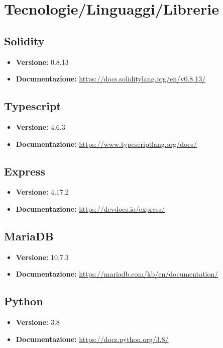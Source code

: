 \documentclass[a4paper, 12pt]{article}
\begin{document}
\section{Tecnologie/Linguaggi/Librerie}

\subsection{Solidity}
\begin{itemize}
\item \textbf{Versione:} 0.8.13
\item \textbf{Documentazione:} \href{https://docs.soliditylang.org/en/v0.8.13/}{https://docs.soliditylang.org/en/v0.8.13/}
\end{itemize}

\subsection{Typescript}
\begin{itemize}
\item \textbf{Versione:} 4.6.3
\item \textbf{Documentazione:} \href{https://www.typescriptlang.org/docs/}{https://www.typescriptlang.org/docs/}
\end{itemize}

\subsection{Express}
\begin{itemize}
\item \textbf{Versione:} 4.17.2
\item \textbf{Documentazione:} \href{https://devdocs.io/express/}{https://devdocs.io/express/}
\end{itemize}

\subsection{MariaDB}
\begin{itemize}
\item \textbf{Versione:} 10.7.3
\item \textbf{Documentazione:} \href{https://mariadb.com/kb/en/documentation/}{https://mariadb.com/kb/en/documentation/}
\end{itemize}

\subsection{Python}
\begin{itemize}
\item \textbf{Versione:} 3.8
\item \textbf{Documentazione:} \href{https://docs.python.org/3.8/}{https://docs.python.org/3.8/}
\end{itemize}
\end{document}
